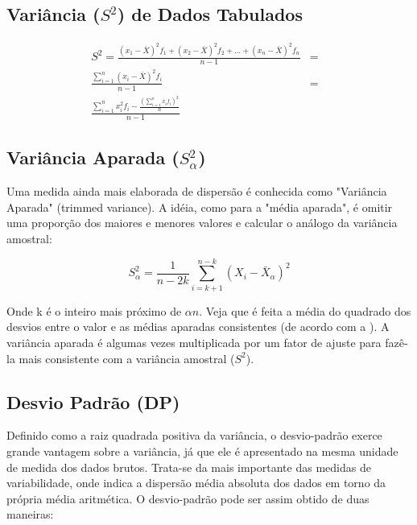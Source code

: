 \subsection{Variância ($S^{2}$) de Dados Tabulados}


\begin{eqnarray}\nonumber
S^{2}=\frac{(x_{1}-\bar{X})^{2}f_{1}+(x_{2}-\bar{X})^{2}f_{2}+\ldots+(x_{n}-\bar{X})^{2}f_{n}}{n-1}
    & = &  \\
    \frac{\sum_{i=1}^{n}(x_{i}-\bar{X})^{2}f_{i}}{n-1}& = &  \\ \nonumber
    \frac{\sum_{i=1}^{n}x_{i}^{2}f_{i}-\frac{(\sum_{i=1}^{n}x_{i}f_{i})^{2}}{n}}{n-1} &  &
\end{eqnarray}



\subsection{Variância Aparada ($S_{\alpha}^{2}$)}

Uma medida ainda mais elaborada de dispersão é conhecida como "Variância Aparada" (trimmed variance). A idéia, como para a "média aparada", é omitir uma proporção dos maiores e menores valores e calcular o análogo da variância amostral:

\begin{equation}\label{varAparada}
    S_{\alpha}^{2}=\frac{1}{n-2k}\sum_{i=k+1}^{n-k}(X_{i}-\bar{X}_{\alpha})^{2}
\end{equation}


Onde k é o inteiro mais próximo de $\alpha n$. Veja que é feita a média do quadrado dos desvios entre o valor e as médias aparadas consistentes (de acordo com a \label{aparada}). A variância aparada é algumas vezes multiplicada por um fator de ajuste para fazê-la mais consistente com a variância amostral ($S^{2}$).


\subsection{Desvio Padrão (DP)}

Definido como a raiz quadrada positiva da variância, o desvio-padrão exerce grande vantagem sobre a variância, já que ele é apresentado na mesma unidade de medida dos dados brutos. Trata-se da mais importante das medidas de variabilidade, onde indica a dispersão média absoluta dos dados em torno da própria média aritmética. O desvio-padrão pode ser assim obtido de duas maneiras:\vskip0.3cm

